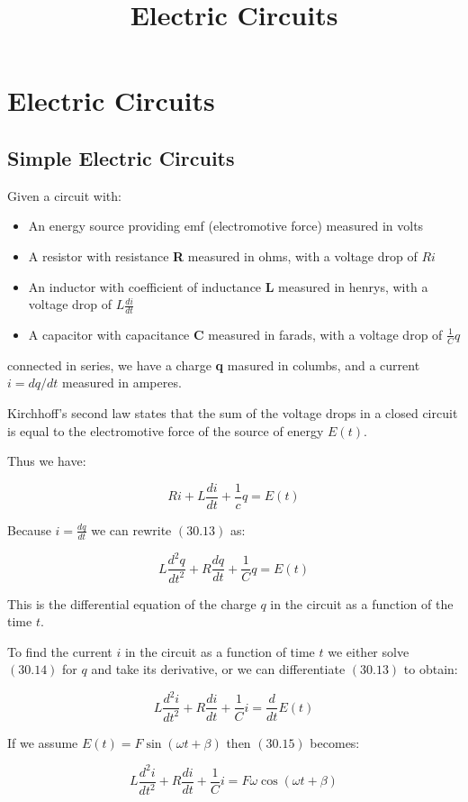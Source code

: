 \documentclass{article}
\title{Electric Circuits}
\begin{document}
\section{Electric Circuits}

\subsection{Simple Electric Circuits}

Given a circuit with:

\begin{itemize}
\item An energy source providing emf (electromotive force) measured in volts
\item A resistor with resistance \textbf{R} measured in ohms, with a voltage drop of $Ri$
\item An inductor with coefficient of inductance \textbf{L} measured in henrys, with a voltage drop of $L\frac{di}{dt}$
\item A capacitor with capacitance \textbf{C} measured in farads, with a voltage drop of $\frac{1}{C}q$
\end{itemize}

connected in series, we have a charge \textbf{q} masured in columbs, and a current $i = dq/dt$ measured in amperes.

Kirchhoff's second law states that the sum of the voltage drops in a closed circuit is equal to the electromotive force of the source of energy $E(t)$.

Thus we have:

\[ \tag{30.13} Ri + L\frac{di}{dt} + \frac{1}{c}q = E(t) \]

Because $i = \frac{dq}{dt}$ we can rewrite $(30.13)$ as:

\[ \tag{30.14} L\frac{d^2q}{dt^2} + R\frac{dq}{dt} + \frac{1}{C}q = E(t) \]

This is the differential equation of the charge $q$ in the circuit as a function of the time $t$.

To find the current $i$ in the circuit as a function of time $t$ we either solve $(30.14)$ for $q$ and take its derivative, or we can differentiate $(30.13)$ to obtain:

\[ \tag{30.15} L\frac{d^2 i}{dt^2} + R\frac{di}{dt} + \frac{1}{C}i = \frac{d}{dt} E(t) \]

If we assume $E(t) = F \sin{(\omega t + \beta)}$ then $(30.15)$ becomes:

\[ \tag{30.17} L\frac{d^2 i}{dt^2} + R\frac{di}{dt} + \frac{1}{C}i = F \omega \cos{(\omega t + \beta)} \]
\end{document}
